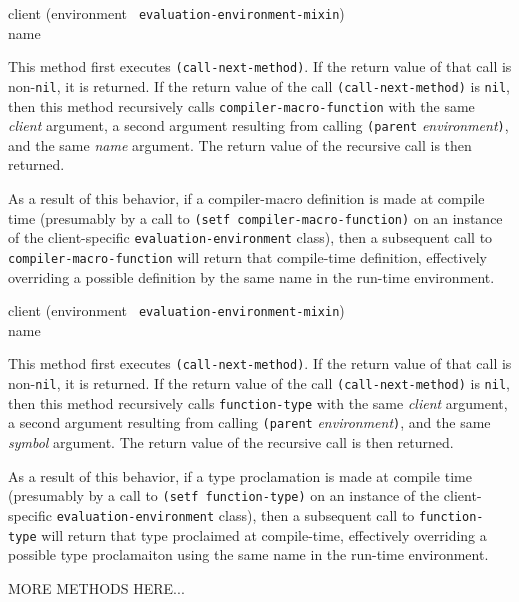 {\small{} {client (environment {\tt
      evaluation-environment-mixin}) \\ name}
}

This method first executes \texttt{(call-next-method)}.  If the return
value of that call is non-\texttt{nil}, it is returned.  If the return
value of the call \texttt{(call-next-method)} is \texttt{nil}, then
this method recursively calls \texttt{compiler-macro-function} with
the same \textit{client} argument, a second argument resulting from
calling \texttt{(parent} \textit{environment}\texttt{)}, and the same
\textit{name} argument.  The return value of the recursive
call is then returned.

As a result of this behavior, if a compiler-macro definition is made
at compile time (presumably by a call to \texttt{(setf
  compiler-macro-function)} on an instance of the client-specific
\texttt{evaluation-environment} class), then a subsequent call to
\texttt{compiler-macro-function} will return that compile-time
definition, effectively overriding a possible definition by the same
name in the run-time environment.

{\small{} {client (environment {\tt
      evaluation-environment-mixin}) \\ name}
}

This method first executes \texttt{(call-next-method)}.  If the return
value of that call is non-\texttt{nil}, it is returned.  If the return
value of the call \texttt{(call-next-method)} is \texttt{nil}, then
this method recursively calls \texttt{function-type} with the same
\textit{client} argument, a second argument resulting from calling
\texttt{(parent} \textit{environment}\texttt{)}, and the same
\textit{symbol} argument.  The return value of the recursive
call is then returned.

As a result of this behavior, if a type proclamation is made at
compile time (presumably by a call to \texttt{(setf function-type)} on
an instance of the client-specific \texttt{evaluation-environment}
class), then a subsequent call to \texttt{function-type} will return
that type proclaimed at compile-time, effectively overriding a
possible type proclamaiton using the same name in the run-time
environment.

MORE METHODS HERE...
